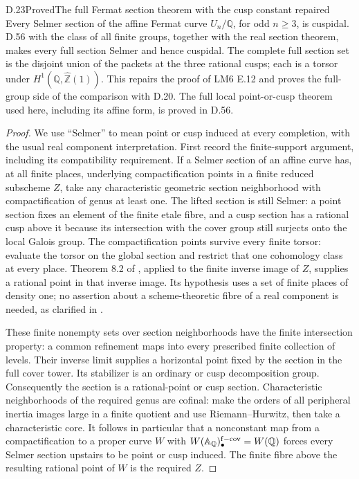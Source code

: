 \begin{statement}{D.23}{Proved}{The full Fermat section theorem with the cusp constant repaired}
Every Selmer section of the affine Fermat curve
\(U_n/\mathbb Q\), for odd \(n\ge3\), is cuspidal.
D.56 with the class of all finite groups,
together with the real section theorem, makes
every full section Selmer and hence cuspidal. The complete full section set is the
disjoint union of the packets at the three rational
cusps; each is a torsor under
\(H^1(\mathbb Q,\widehat{\mathbb Z}(1))\).
This repairs the proof of LM6 E.12 and proves
the full-group side of the comparison with D.20.
The full local point-or-cusp theorem used here,
including its affine form, is proved in D.56.
\end{statement}
\begin{proof}
We use ``Selmer'' to mean point or cusp induced at
every completion, with the usual real component
interpretation. First record the finite-support
argument, including its compatibility requirement.
If a Selmer section of an affine curve has, at
all finite places, underlying compactification
points in a finite reduced subscheme \(Z\), take
any characteristic geometric section neighborhood
with compactification of genus at least one.
The lifted section is still Selmer: a point
section fixes an element of the finite etale
fibre, and a cusp section has a rational cusp
above it because its intersection with the
cover group still surjects onto the local
Galois group. The compactification points
survive every finite torsor: evaluate the torsor
on the global section and restrict that one
cohomology class at every place. Theorem 8.2
of \cite{DE_Stoll2007}, applied to the finite
inverse image of \(Z\), supplies a rational
point in that inverse image. Its hypothesis
uses a set of finite places of density one;
no assertion about a scheme-theoretic fibre
of a real component is needed, as clarified
in \cite[\S3]{DE_StollErratum}.

These finite nonempty sets over section
neighborhoods have the finite intersection
property: a common refinement maps into
every prescribed finite collection of levels.
Their inverse limit supplies a horizontal
point fixed by the section in the full cover
tower. Its stabilizer is an ordinary or cusp
decomposition group. Consequently the section
is a rational-point or cusp section. Characteristic
neighborhoods of the required genus are cofinal:
make the orders of all peripheral inertia
images large in a finite quotient and use
Riemann--Hurwitz, then take a characteristic
core. It follows in particular that a nonconstant
map from a compactification to a proper curve
\(W\) with \(W(\mathbb A_\mathbb Q)_\bullet^{\rm f-cov}
=W(\mathbb Q)\) forces every Selmer section
upstairs to be point or cusp induced. The
finite fibre above the resulting rational
point of \(W\) is the required \(Z\).


\end{proof}
